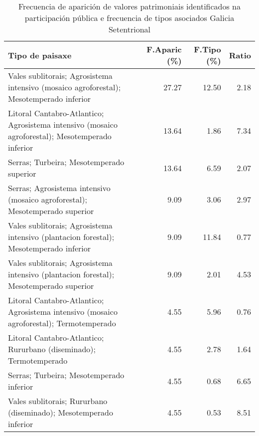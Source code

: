 \begin{table}[p]
\centering
\caption{Frecuencia de aparición de valores patrimoniais identificados na participación pública e frecuencia de tipos asociados Galicia Setentrional} 
\label{vsixotpat10}
\begin{tabular}{lrrr}
  \hline
Tipo de paisaxe & F.Aparic (\%) & F.Tipo (\%) & Ratio \\ 
  \hline
Vales sublitorais; Agrosistema intensivo (mosaico agroforestal); Mesotemperado inferior & 27.27 & 12.50 & 2.18 \\ 
  Litoral Cantabro-Atlantico; Agrosistema intensivo (mosaico agroforestal); Mesotemperado inferior & 13.64 & 1.86 & 7.34 \\ 
  Serras; Turbeira; Mesotemperado superior & 13.64 & 6.59 & 2.07 \\ 
  Serras; Agrosistema intensivo (mosaico agroforestal); Mesotemperado superior & 9.09 & 3.06 & 2.97 \\ 
  Vales sublitorais; Agrosistema intensivo (plantacion forestal); Mesotemperado inferior & 9.09 & 11.84 & 0.77 \\ 
  Vales sublitorais; Agrosistema intensivo (plantacion forestal); Mesotemperado superior & 9.09 & 2.01 & 4.53 \\ 
  Litoral Cantabro-Atlantico; Agrosistema intensivo (mosaico agroforestal); Termotemperado & 4.55 & 5.96 & 0.76 \\ 
  Litoral Cantabro-Atlantico; Rururbano (diseminado); Termotemperado & 4.55 & 2.78 & 1.64 \\ 
  Serras; Turbeira; Mesotemperado inferior & 4.55 & 0.68 & 6.65 \\ 
  Vales sublitorais; Rururbano (diseminado); Mesotemperado inferior & 4.55 & 0.53 & 8.51 \\ 
   \hline
\end{tabular}
\end{table}

